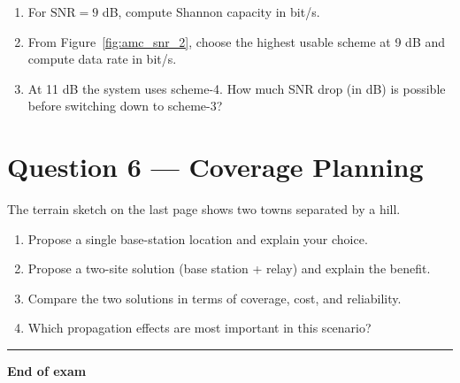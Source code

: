 \documentclass[11pt,a4paper]{article}
\begin{document}
\begin{enumerate}[label=\alph*)]
    \item For $\mathrm{SNR}=9$ dB, compute Shannon capacity in bit/s.
    \item From Figure~\ref{fig:amc_snr_2}, choose the highest usable scheme at 9 dB and compute data rate in bit/s.
    \item At 11 dB the system uses scheme-4. How much SNR drop (in dB) is possible before switching down to scheme-3?
\end{enumerate}

\section*{Question 6 --- Coverage Planning}
The terrain sketch on the last page shows two towns separated by a hill.

\begin{enumerate}[label=\alph*)]
\item Propose a single base-station location and explain your choice.
\item Propose a two-site solution (base station + relay) and explain the benefit.
\item Compare the two solutions in terms of coverage, cost, and reliability.
\item Which propagation effects are most important in this scenario?
\end{enumerate}

\vspace{0.6cm}
\hrule
\vspace{0.3cm}
\textbf{End of exam}


\clearpage
\label{LastPage}
\end{document}
